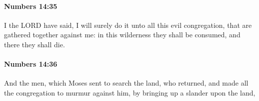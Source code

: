 		\paragraph{Numbers 14:35} %
			\label{NUMBERS-14-35}

			I the LORD have said, I will surely do it unto all this evil congregation, that are gathered together against me: in this wilderness they shall be consumed, and there they shall die.


		\paragraph{Numbers 14:36} %
			\label{NUMBERS-14-36}

			And the men, which Moses sent to search the land, who returned, and made all the congregation to murmur against him, by bringing up a slander upon the land,


